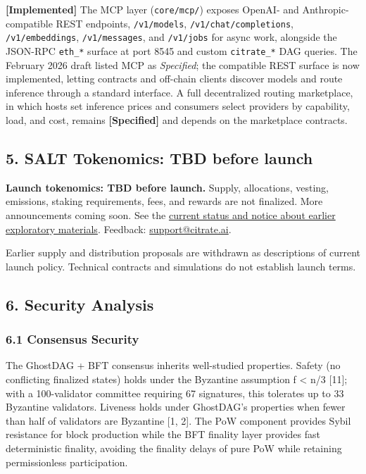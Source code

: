 \textbf{{[}Implemented{]}} The MCP layer (\texttt{core/mcp/}) exposes
OpenAI- and Anthropic-compatible REST endpoints, \texttt{/v1/models},
\texttt{/v1/chat/completions}, \texttt{/v1/embeddings},
\texttt{/v1/messages}, and \texttt{/v1/jobs} for async work, alongside
the JSON-RPC \texttt{eth\_*} surface at port 8545 and custom
\texttt{citrate\_*} DAG queries. The February 2026 draft listed MCP as
\emph{Specified}; the compatible REST surface is now implemented,
letting contracts and off-chain clients discover models and route
inference through a standard interface. A full decentralized routing
marketplace, in which hosts set inference prices and consumers select
providers by capability, load, and cost, remains
\textbf{{[}Specified{]}} and depends on the marketplace contracts.

\subsection{5. SALT Tokenomics: TBD before launch}\label{salt-tokenomics}

\textbf{Launch tokenomics: TBD before launch.} Supply, allocations, vesting, emissions,
staking requirements, fees, and rewards are not finalized. More announcements coming soon.
See the \href{https://docs.citrate.ai/chain/economics}{current status and notice about earlier exploratory materials}.
Feedback: \href{mailto:support@citrate.ai}{support@citrate.ai}.

Earlier supply and distribution proposals are withdrawn as descriptions of current launch policy.
Technical contracts and simulations do not establish launch terms.

\subsection{6. Security Analysis}\label{security-analysis}

\subsubsection{6.1 Consensus Security}\label{consensus-security}

The GhostDAG + BFT consensus inherits well-studied properties. Safety
(no conflicting finalized states) holds under the Byzantine assumption f
\textless{} n/3 {[}11{]}; with a 100-validator committee requiring 67
signatures, this tolerates up to 33 Byzantine validators. Liveness holds
under GhostDAG's properties when fewer than half of validators are
Byzantine {[}1, 2{]}. The PoW component provides Sybil resistance for
block production while the BFT finality layer provides fast
deterministic finality, avoiding the finality delays of pure PoW while
retaining permissionless participation.

